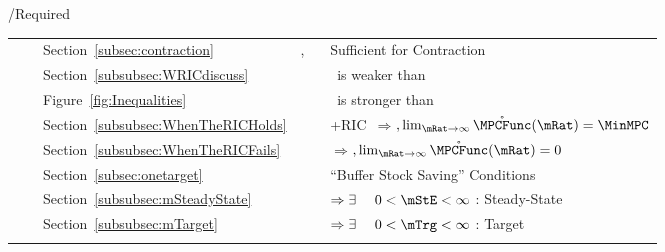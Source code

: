 \documentclass[\econtexRoot/BufferStockTheory]{subfiles}
\begin{document}
\begin{verbatimwrite}{\TableDir/Required}
\begin{table}
{\begin{tabular}{|l|l|l|}
  \\ \cline{2-3} {~~~~Section~\ref{subsec:contraction}}                            & \FVAC, \WRIC~                     & Sufficient for Contraction
 \\ {~~~~Section~\ref{subsubsec:WRICdiscuss}}                               &                      & \WRIC~is weaker than \RIC~
\\  {~~~~Figure~\ref{fig:Inequalities}}                                        &                                 & \FVAC~is stronger than \PFFVAC~
  \\ {~~~~Section~\ref{subsubsec:WhenTheRICHolds}}
                                            &                                 & \cncl{\FHWC}+RIC~$\Rightarrow $\GIC$, \lim_{\mRat \rightarrow \infty} \mathring{\MPCFunc}(\mRat)=\MinMPC$
  \\  ~~~~Section~\ref{subsubsec:WhenTheRICFails}                                        &                                 & \cncl{\RIC}  $\Rightarrow $\cncl{\FHWC}$, \lim_{\mRat \rightarrow \infty} \mathring{\MPCFunc}(\mRat)=0$
  \\ \cline{3-3}{~~~~Section~\ref{subsec:onetarget}}                                        &                                 & ``Buffer Stock Saving'' Conditions
  \\ {~~~~Section~\ref{subsubsec:mSteadyState}}                                        &                                 & \phantom{-Nrm}{\GIC} $\Rightarrow \exists~~~~ 0 < \mStE < \infty$ : Steady-State
  \\ {~~~~Section~\ref{subsubsec:mTarget}}                                        &                                 & {\GICNrm} $\Rightarrow \exists~~~~ 0 < \mTrg < \infty$ : Target
                                                                                  
\\ \hline \multicolumn{3}{c}{}
\end{tabular}
} %


\end{table}
\end{verbatimwrite}
\end{document}
